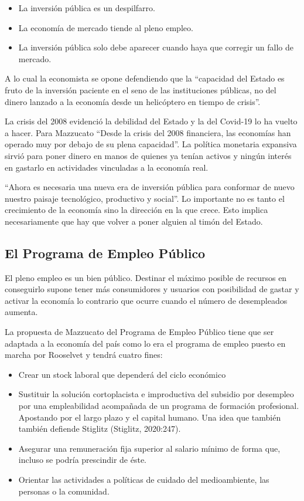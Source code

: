 \documentclass[
]{article}
\begin{document}
\begin{itemize}
\item
  La inversión pública es un despilfarro.
\item
  La economía de mercado tiende al pleno empleo.
\item
  La inversión pública solo debe aparecer cuando haya que corregir un
  fallo de mercado.
\end{itemize}

A lo cual la economista se opone defendiendo que la ``capacidad del
Estado es fruto de la inversión paciente en el seno de las instituciones
públicas, no del dinero lanzado a la economía desde un helicóptero en
tiempo de crisis''.

La crisis del 2008 evidenció la debilidad del Estado y la del Covid-19
lo ha vuelto a hacer. Para Mazzucato ``Desde la crisis del 2008
financiera, las economías han operado muy por debajo de su plena
capacidad''. La política monetaria expansiva sirvió para poner dinero en
manos de quienes ya tenían activos y ningún interés en gastarlo en
actividades vinculadas a la economía real.

``Ahora es necesaria una nueva era de inversión pública para conformar
de nuevo nuestro paisaje tecnológico, productivo y social''. Lo
importante no es tanto el crecimiento de la economía sino la dirección
en la que crece. Esto implica necesariamente que hay que volver a poner
alguien al timón del Estado.

\hypertarget{el-programa-de-empleo-puxfablico}{%
\subsection{El Programa de Empleo
Público}\label{el-programa-de-empleo-puxfablico}}

El pleno empleo es un bien público. Destinar el máximo posible de
recursos en conseguirlo supone tener más consumidores y usuarios con
posibilidad de gastar y activar la economía lo contrario que ocurre
cuando el número de desempleados aumenta.

La propuesta de Mazzucato del Programa de Empleo Público tiene que ser
adaptada a la economía del país como lo era el programa de empleo puesto
en marcha por Rooselvet y tendrá cuatro fines:

\begin{itemize}
\item
  Crear un stock laboral que dependerá del ciclo económico
\item
  Sustituir la solución cortoplacista e improductiva del subsidio por
  desempleo por una empleabilidad acompañada de un programa de formación
  profesional. Apostando por el largo plazo y el capital humano. Una
  idea que también también defiende Stiglitz (Stiglitz, 2020:247).
\item
  Asegurar una remuneración fija superior al salario mínimo de forma
  que, incluso se podría prescindir de éste.
\item
  Orientar las actividades a políticas de cuidado del medioambiente, las
  personas o la comunidad.
\end{itemize}
\end{document}
